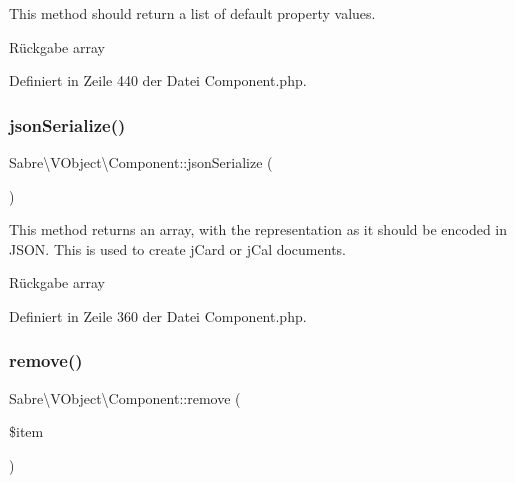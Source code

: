 This method should return a list of default property values.

\begin{DoxyReturn}{Rückgabe}
array 
\end{DoxyReturn}


Definiert in Zeile 440 der Datei Component.\+php.

\mbox{\label{class_sabre_1_1_v_object_1_1_component_a26e668c96dbe42b7c9fa49e91cc463b0}} 
\subsubsection{\texorpdfstring{json\+Serialize()}{jsonSerialize()}}
{\footnotesize\ttfamily Sabre\textbackslash{}\+V\+Object\textbackslash{}\+Component\+::json\+Serialize (\begin{DoxyParamCaption}{ }\end{DoxyParamCaption})}

This method returns an array, with the representation as it should be encoded in J\+S\+ON. This is used to create j\+Card or j\+Cal documents.

\begin{DoxyReturn}{Rückgabe}
array 
\end{DoxyReturn}


Definiert in Zeile 360 der Datei Component.\+php.

\mbox{\label{class_sabre_1_1_v_object_1_1_component_ac844b1ce72cf40be7e10b69e0f50d055}} 
\subsubsection{\texorpdfstring{remove()}{remove()}}
{\footnotesize\ttfamily Sabre\textbackslash{}\+V\+Object\textbackslash{}\+Component\+::remove (\begin{DoxyParamCaption}\item[{}]{\$item }\end{DoxyParamCaption})}

